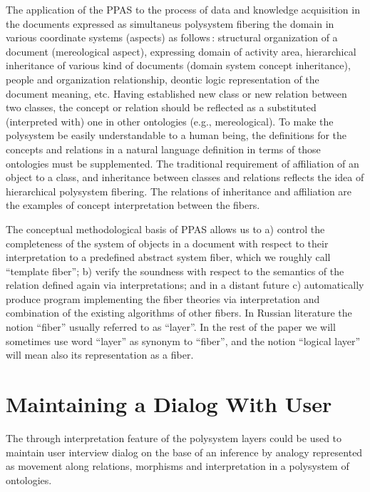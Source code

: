 \documentclass[conference]{IEEEtran}
\begin{document}
The application of the PPAS to the process of data and knowledge
acquisition in the documents expressed as simultaneus polysystem
fibering the domain in various coordinate systems (aspects) as
follows\,: structural organization of a document (mereological
aspect), expressing domain of activity area, hierarchical inheritance
of various kind of documents (domain system concept inheritance),
people and organization relationship, deontic logic representation of
the document meaning, etc.  Having established new class or new
relation between two classes, the concept or relation should be
reflected as a substituted (interpreted with) one in other ontologies
(e.g., mereological).  To make the polysystem be easily understandable
to a human being, the definitions for the concepts and relations in a
natural language definition in terms of those ontologies must be
supplemented.  The traditional requirement of affiliation of an object
to a class, and inheritance between classes and relations reflects the
idea of hierarchical polysystem fibering.  The relations of
inheritance and affiliation are the examples of concept interpretation
between the fibers.

The conceptual methodological basis of PPAS allows us to a) control
the completeness of the system of objects in a document with respect
to their interpretation to a predefined abstract system fiber, which
we roughly call ``template fiber''; b) verify the soundness with
respect to the semantics of the relation defined again via
interpretations; and in a distant future c) automatically produce
program implementing the fiber theories via interpretation and
combination of the existing algorithms of other fibers.  In Russian
literature the notion ``fiber'' usually referred to as ``layer''.  In
the rest of the paper we will sometimes use word ``layer'' as synonym
to ``fiber'', and the notion ``logical layer'' will mean also its
representation as a fiber.

\section{Maintaining a Dialog With User}

The through interpretation feature of the polysystem layers could be
used to maintain user interview dialog on the base of an inference by
analogy represented as movement along relations, morphisms and
interpretation in a polysystem of ontologies.
\end{document}
